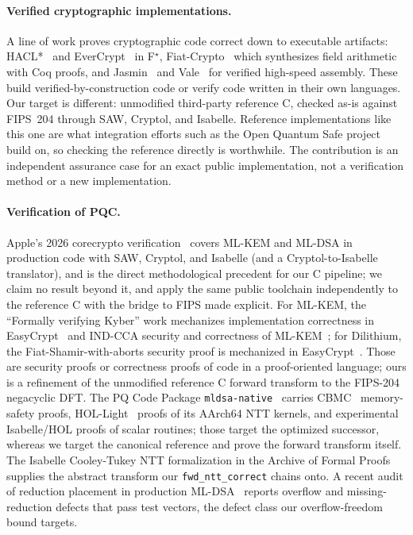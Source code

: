 \documentclass[11pt]{article}
\newcommand{\code}[1]{\texttt{#1}}
\begin{document}
\paragraph{Verified cryptographic implementations.} A line of work proves cryptographic code correct
down to executable artifacts: HACL*~\cite{hacl} and EverCrypt~\cite{evercrypt} in F$^\star$,
Fiat-Crypto~\cite{fiatcrypto} which synthesizes field arithmetic with Coq proofs, and Jasmin~\cite{jasmin}
and Vale~\cite{vale} for verified high-speed assembly. These build verified-by-construction code or
verify code written in their own languages. Our target is different: unmodified third-party reference C,
checked as-is against FIPS~204 through SAW, Cryptol, and Isabelle. Reference implementations like this one
are what integration efforts such as the Open Quantum Safe project~\cite{liboqs} build on, so checking the
reference directly is worthwhile. The contribution is an independent assurance case for an exact public
implementation, not a verification method or a new implementation.

\paragraph{Verification of PQC.} Apple's 2026 corecrypto verification~\cite{corecrypto} covers ML-KEM and
ML-DSA in production code with SAW, Cryptol, and Isabelle (and a Cryptol-to-Isabelle translator), and is
the direct methodological precedent for our C pipeline; we claim no result beyond it, and apply the same
public toolchain independently to the reference C with the bridge to FIPS made explicit. For ML-KEM, the
``Formally verifying Kyber'' work mechanizes implementation correctness in EasyCrypt~\cite{fvkyber4} and
IND-CCA security and correctness of ML-KEM~\cite{fvkyber5}; for Dilithium, the Fiat-Shamir-with-aborts
security proof is mechanized in EasyCrypt~\cite{jazzdilithium}. Those are security proofs or
correctness proofs of code in a proof-oriented language; ours is a refinement of the unmodified reference
C forward transform to the FIPS-204 negacyclic DFT. The PQ Code Package \code{mldsa-native}~\cite{mldsanative}
carries CBMC~\cite{cbmc} memory-safety proofs, HOL-Light~\cite{hollight} proofs of its AArch64 NTT
kernels, and experimental Isabelle/HOL proofs of scalar routines; those target the optimized successor,
whereas we target the canonical reference and prove the forward transform itself. The Isabelle Cooley-Tukey
NTT formalization in the Archive of Formal Proofs~\cite{afpntt} supplies the abstract transform our
\code{fwd\_ntt\_correct} chains onto. A recent audit of reduction placement in production
ML-DSA~\cite{eprint1032} reports overflow and missing-reduction defects that pass test vectors, the defect
class our overflow-freedom bound targets.
\end{document}
